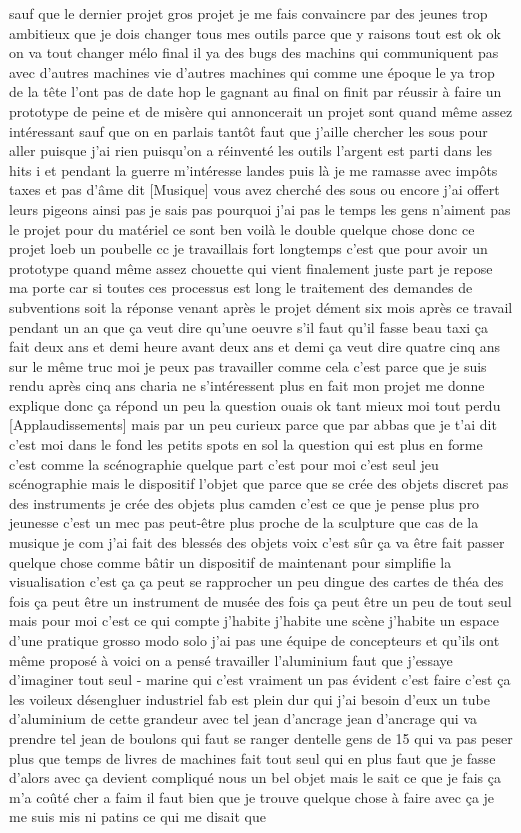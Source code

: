 sauf que le dernier projet gros projet je me fais convaincre par des jeunes trop ambitieux que je dois changer tous mes outils parce que y raisons tout est ok ok on va tout changer mélo final il ya des bugs des machins qui communiquent pas avec d'autres machines vie d'autres machines qui comme une époque le ya trop de la tête l'ont pas de date hop le gagnant au final on finit par réussir à faire un prototype de peine et de misère qui annoncerait un projet sont quand même assez intéressant sauf que on en parlais tantôt faut que j'aille chercher les sous pour aller puisque j'ai rien puisqu'on a réinventé les outils l'argent est parti dans les hits i et pendant la guerre m'intéresse landes puis là je me ramasse avec impôts taxes et pas d'âme dit [Musique] vous avez cherché des sous ou encore j'ai offert leurs pigeons ainsi pas je sais pas pourquoi j'ai pas le temps les gens n'aiment pas le projet pour du matériel ce sont ben voilà le double quelque chose donc ce projet loeb un poubelle cc je travaillais fort longtemps c'est que pour avoir un prototype quand même assez chouette qui vient finalement juste part je repose ma porte car si toutes ces processus est long le traitement des demandes de subventions soit la réponse venant après le projet dément six mois après ce travail pendant un an que ça veut dire qu'une oeuvre s'il faut qu'il fasse beau taxi ça fait deux ans et demi heure avant deux ans et demi ça veut dire quatre cinq ans sur le même truc moi je peux pas travailler comme cela c'est parce que je suis rendu après cinq ans charia ne s'intéressent plus en fait mon projet me donne explique donc ça répond un peu la question ouais ok tant mieux moi tout perdu [Applaudissements] mais par un peu curieux parce que par abbas que je t'ai dit c'est moi dans le fond les petits spots en sol la question qui est plus en forme c'est comme la scénographie quelque part c'est pour moi c'est seul jeu scénographie mais le dispositif l'objet que parce que se crée des objets discret pas des instruments je crée des objets plus camden c'est ce que je pense plus pro jeunesse c'est un mec pas peut-être plus proche de la sculpture que cas de la musique je com j'ai fait des blessés des objets voix c'est sûr ça va être fait passer quelque chose comme bâtir un dispositif de maintenant pour simplifie la visualisation c'est ça ça peut se rapprocher un peu dingue des cartes de théa des fois ça peut être un instrument de musée des fois ça peut être un peu de tout seul mais pour moi c'est ce qui compte j'habite j'habite une scène j'habite un espace d'une pratique grosso modo solo j'ai pas une équipe de concepteurs et qu'ils ont même proposé à voici on a pensé travailler l'aluminium faut que j'essaye d'imaginer tout seul - marine qui c'est vraiment un pas évident c'est faire c'est ça les voileux désengluer industriel fab est plein dur qui j'ai besoin d'eux un tube d'aluminium de cette grandeur avec tel jean d'ancrage jean d'ancrage qui va prendre tel jean de boulons qui faut se ranger dentelle gens de 15 qui va pas peser plus que temps de livres de machines fait tout seul qui en plus faut que je fasse d'alors avec ça devient compliqué nous un bel objet mais le sait ce que je fais ça m'a coûté cher a faim il faut bien que je trouve quelque chose à faire avec ça je me suis mis ni patins ce qui me disait que 